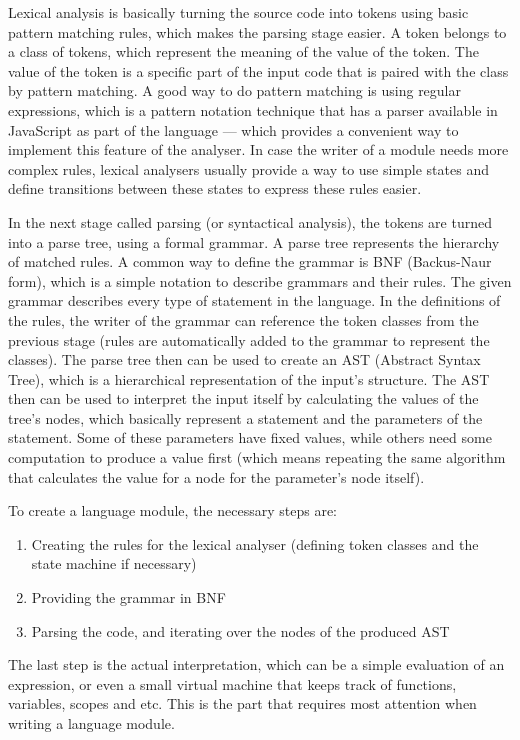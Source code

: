 Lexical analysis is basically turning the source code into tokens using basic pattern matching rules, which makes the parsing stage easier. A token belongs to a class of tokens, which represent the meaning of the value of the token. The value of the token is a specific part of the input code that is paired with the class by pattern matching. A good way to do pattern matching is using regular expressions, which is a pattern notation technique that has a parser available in JavaScript as part of the language --- which provides a convenient way to implement this feature of the analyser. In case the writer of a module needs more complex rules, lexical analysers usually provide a way to use simple states and define transitions between these states to express these rules easier.

In the next stage called parsing (or syntactical analysis), the tokens are turned into a parse tree, using a formal grammar. A parse tree represents the hierarchy of matched rules. A common way to define the grammar is BNF (Backus-Naur form), which is a simple notation to describe grammars and their rules. The given grammar describes every type of statement in the language. In the definitions of the rules, the writer of the grammar can reference the token classes from the previous stage (rules are automatically added to the grammar to represent the classes). The parse tree then can be used to create an AST (Abstract Syntax Tree), which is a hierarchical representation of the input's structure. The AST then can be used to interpret the input itself by calculating the values of the tree's nodes, which basically represent a statement and the parameters of the statement. Some of these parameters have fixed values, while others need some computation to produce a value first (which means repeating the same algorithm that calculates the value for a node for the parameter's node itself).

To create a language module, the necessary steps are:
\begin{enumerate}
\item Creating the rules for the lexical analyser (defining token classes and the state machine if necessary)
\item Providing the grammar in BNF
\item Parsing the code, and iterating over the nodes of the produced AST
\end{enumerate}
The last step is the actual interpretation, which can be a simple evaluation of an expression, or even a small virtual machine that keeps track of functions, variables, scopes and etc. This is the part that requires most attention when writing a language module.

